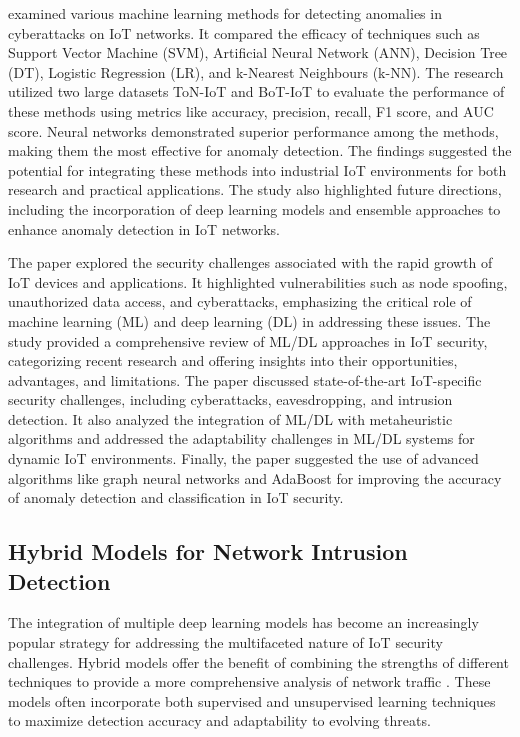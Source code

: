 \citet{inuwa2024comparative} examined various machine learning methods for detecting anomalies in cyberattacks on IoT networks. It compared the efficacy of techniques such as Support Vector Machine (SVM), Artificial Neural Network (ANN), Decision Tree (DT), Logistic Regression (LR), and k-Nearest Neighbours (k-NN). The research utilized two large datasets ToN-IoT and BoT-IoT to evaluate the performance of these methods using metrics like accuracy, precision, recall, F1 score, and AUC score. Neural networks demonstrated superior performance among the methods, making them the most effective for anomaly detection. The findings suggested the potential for integrating these methods into industrial IoT environments for both research and practical applications. The study also highlighted future directions, including the incorporation of deep learning models and ensemble approaches to enhance anomaly detection in IoT networks.

The paper \citet{ghaffari2024securing} explored the security challenges associated with the rapid growth of IoT devices and applications. It highlighted vulnerabilities such as node spoofing, unauthorized data access, and cyberattacks, emphasizing the critical role of machine learning (ML) and deep learning (DL) in addressing these issues. The study provided a comprehensive review of ML/DL approaches in IoT security, categorizing recent research and offering insights into their opportunities, advantages, and limitations. The paper discussed state-of-the-art IoT-specific security challenges, including cyberattacks, eavesdropping, and intrusion detection. It also analyzed the integration of ML/DL with metaheuristic algorithms and addressed the adaptability challenges in ML/DL systems for dynamic IoT environments. Finally, the paper suggested the use of advanced algorithms like graph neural networks and AdaBoost for improving the accuracy of anomaly detection and classification in IoT security.
\subsection{Hybrid Models for Network Intrusion Detection}

The integration of multiple deep learning models has become an increasingly popular strategy for addressing the multifaceted nature of IoT security challenges. Hybrid models offer the benefit of combining the strengths of different techniques to provide a more comprehensive analysis of network traffic \cite{wang2024abnormal, bakhshi2021anomaly, lo2022hybrid}. These models often incorporate both supervised and unsupervised learning techniques to maximize detection accuracy and adaptability to evolving threats.

